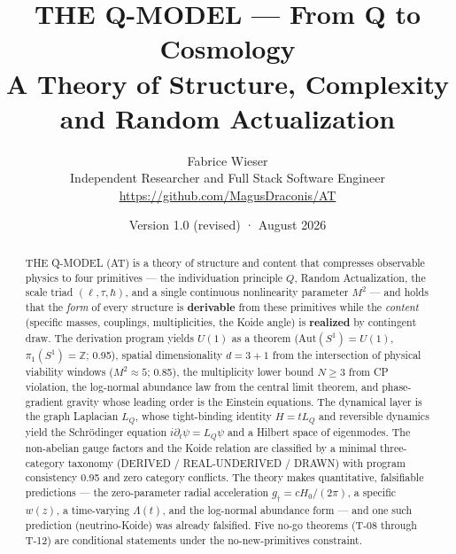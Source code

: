 \documentclass[11pt,a4paper]{article}
\title{\bfseries THE Q-MODEL — From Q to Cosmology\\[2mm]
\large A Theory of Structure, Complexity and Random Actualization}
\author{Fabrice Wieser\\[1mm]
\small Independent Researcher and Full Stack Software Engineer\\[0.5mm]
\small \url{https://github.com/MagusDraconis/AT}}
\date{Version 1.0 (revised) \quad·\quad 15 August 2026}
\begin{document}
\maketitle

\begin{center}
\end{center}

\vspace{2mm}

\begin{abstract}
\noindent
THE Q-MODEL (AT) is a theory of structure and content that compresses observable physics
to four primitives — the individuation principle $Q$, Random Actualization, the scale
triad $(\ell,\tau,\hbar)$, and a single continuous nonlinearity parameter $M^2$ — and
holds that the \emph{form} of every structure is \textbf{derivable} from these primitives
while the \emph{content} (specific masses, couplings, multiplicities, the Koide angle) is
\textbf{realized} by contingent draw. The derivation program yields $U(1)$ as a theorem
($\mathrm{Aut}(S^1)=U(1)$, $\pi_1(S^1)=\mathbb{Z}$; 0.95), spatial dimensionality
$d=3{+}1$ from the intersection of physical viability windows ($M^2\approx5$; 0.85), the
multiplicity lower bound $N\ge3$ from CP violation, the log-normal abundance law from the
central limit theorem, and phase-gradient gravity whose leading order is the Einstein
equations. The dynamical layer is the graph Laplacian $L_Q$, whose tight-binding identity
$H=tL_Q$ and reversible dynamics yield the Schr\"odinger equation
$i\partial_t\psi=L_Q\psi$ and a Hilbert space of eigenmodes. The non-abelian gauge factors
and the Koide relation are classified by a minimal three-category taxonomy
(DERIVED / REAL-UNDERIVED / DRAWN) with program consistency 0.95 and zero category
conflicts. The theory makes quantitative, falsifiable predictions — the zero-parameter
radial acceleration $g_\dagger=cH_0/(2\pi)$, a specific $w(z)$, a time-varying
$\Lambda(t)$, and the log-normal abundance form — and one such prediction (neutrino-Koide)
was already falsified. Five no-go theorems (T-08 through T-12) are conditional statements
under the no-new-primitives constraint.
\end{abstract}
\end{document}

